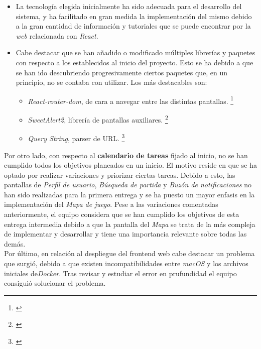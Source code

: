\documentclass[11pt, a4paper, titlepage]{article}
\begin{document}
\begin{itemize}
    \item La tecnología elegida inicialmente ha sido adecuada para el desarrollo del sistema, y ha facilitado en gran medida la implementación del mismo debido a la gran cantidad de información y tutoriales que se puede encontrar por la \textit{web} relacionada con \textit{React}.

    \item Cabe destacar que se han añadido o modificado múltiples librerías y paquetes con respecto a los establecidos al inicio del proyecto. Esto se ha debido a que se han ido descubriendo progresivamente ciertos paquetes que, en un principio, no se contaba con utilizar. Los más destacables son:
        \begin{itemize}
            \item \textit{React-router-dom}, de cara a navegar entre las distintas pantallas. \footnote{\href{https://v5.reactrouter.com/web/guides/quick-start}{}}
            \item \textit{SweetAlert2}, librería de pantallas auxiliares.
            \footnote{\href{https://sweetalert2.github.io}{}}
            \item \textit{Query String}, parser de URL.
            \footnote{\href{https://www.npmjs.com/package/query-string}{}}
        \end{itemize}
\end{itemize}

Por otro lado, con respecto al \textbf{calendario de tareas} fijado al inicio, no se han cumplido todos los objetivos planeados en un inicio. El motivo reside en que se ha optado por realizar variaciones y priorizar ciertas tareas.
Debido a esto, las pantallas de \textit{Perfil de usuario}, \textit{Búsqueda de partida} y \textit{Buzón de notificaciones} no han sido realizadas para la primera entrega y se ha puesto un mayor enfasis en la implementación del \textit{Mapa de juego}.
Pese a las variaciones comentadas anteriormente, el equipo considera que se han cumplido los objetivos de esta entrega intermedia debido a que la pantalla del \textit{Mapa} se trata de la más compleja de implementar y desarrollar y tiene una importancia relevante sobre todas las demás. \\

Por último, en relación al despliegue del frontend web cabe destacar un problema que surgió, debido a que existen incompatibilidades entre \textit{macOS} y los archivos iniciales de\textit{Docker}. Tras revisar y estudiar el error en prufundidad el equipo consiguió solucionar el problema.
\end{document}
